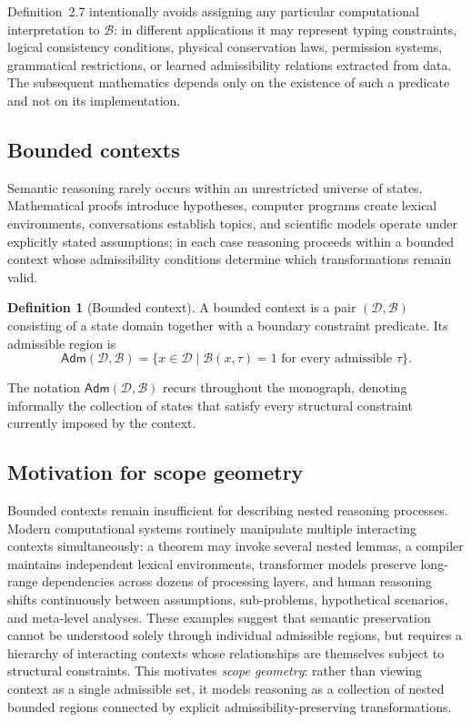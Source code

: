 \documentclass[11pt,twoside,openright]{book}
\numberwithin{equation}{chapter}
\theoremstyle{definition}
\newtheorem{definition}{Definition}[chapter]
\theoremstyle{plain}
\theoremstyle{remark}
\theoremstyle{definition}
\newcommand{\Boundary}{\mathcal{B}}
\newcommand{\Domain}{\mathcal{D}}
\newcommand{\Adm}{\mathsf{Adm}}
\begin{document}
Definition~2.7 intentionally avoids assigning any particular computational
interpretation to $\Boundary$: in different applications it may represent
typing constraints, logical consistency conditions, physical conservation
laws, permission systems, grammatical restrictions, or learned
admissibility relations extracted from data. The subsequent mathematics
depends only on the existence of such a predicate and not on its
implementation.

\subsection{Bounded contexts}

Semantic reasoning rarely occurs within an unrestricted universe of
states. Mathematical proofs introduce hypotheses, computer programs
create lexical environments, conversations establish topics, and
scientific models operate under explicitly stated assumptions; in each
case reasoning proceeds within a bounded context whose admissibility
conditions determine which transformations remain valid.

\begin{definition}[Bounded context]
A bounded context is a pair $(\Domain,\Boundary)$ consisting of a state
domain together with a boundary constraint predicate. Its admissible
region is
\[
\Adm(\Domain,\Boundary)=\{x\in\Domain \mid \Boundary(x,\tau)=1 \text{ for every admissible } \tau\}.
\]
\end{definition}

The notation $\Adm(\Domain,\Boundary)$ recurs throughout the monograph,
denoting informally the collection of states that satisfy every
structural constraint currently imposed by the context.

\subsection{Motivation for scope geometry}

Bounded contexts remain insufficient for describing nested reasoning
processes. Modern computational systems routinely manipulate multiple
interacting contexts simultaneously: a theorem may invoke several nested
lemmas, a compiler maintains independent lexical environments, transformer
models preserve long-range dependencies across dozens of processing
layers, and human reasoning shifts continuously between assumptions,
sub-problems, hypothetical scenarios, and meta-level analyses. These
examples suggest that semantic preservation cannot be understood solely
through individual admissible regions, but requires a hierarchy of
interacting contexts whose relationships are themselves subject to
structural constraints. This motivates \emph{scope geometry}: rather than
viewing context as a single admissible set, it models reasoning as a
collection of nested bounded regions connected by explicit
admissibility-preserving transformations.
\end{document}
